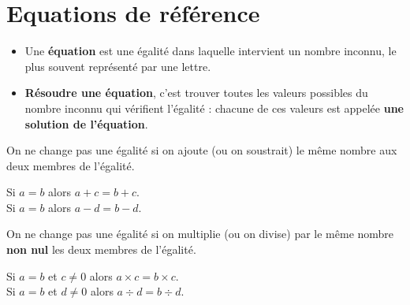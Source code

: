 \section{Equations de référence}
\begin{definition}
    \begin{itemize}
        \item Une \textbf{équation} est une égalité dans laquelle intervient un nombre inconnu, le plus souvent représenté par une lettre.
        \item \textbf{Résoudre une équation}, c'est trouver toutes les valeurs possibles du nombre inconnu qui vérifient l'égalité : chacune de ces valeurs est appelée 
        \textbf{une solution de l'équation}.
    \end{itemize}
\end{definition}

\begin{propriete}[\admise]
    On ne change pas une égalité si on ajoute (ou on soustrait) le même nombre aux deux membres de l'égalité.
    \begin{center}
        Si $a=b$ alors $a+c=b+c$.
        \\
        Si $a=b$ alors $a-d=b-d$.
    \end{center}
\end{propriete}

\begin{propriete}[\admise]
    On ne change pas une égalité si on multiplie (ou on divise) par le même nombre \textbf{non nul} les deux membres de l'égalité.
    \begin{center}
    Si $a=b$ et $c\not=0$ alors $a\times c=b\times c$.
    \\
    Si $a=b$ et $d\not=0$ alors $a\div d=b\div d$.
    \end{center}
\end{propriete}

